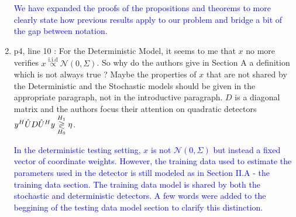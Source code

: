 \documentclass[11pt]{article}
\begin{document}
\begin{enumerate}
\textcolor{blue}{We have expanded the proofs of the propositions and theorems to more clearly state how previous results apply to our problem and bridge a bit of the gap between notation.}

\item p4, line 10 : For the Deterministic Model, it seems to me that $x$ no more verifies $x\overset{\text{i.i.d}}{\propto}\mathcal{N}(0,\Sigma)$. So why
do the authors give in Section A a definition which is not always true ? Maybe the properties of $x$ that are
not shared by the Deterministic and the Stochastic models should be given in the appropriate paragraph,
not in the introductive paragraph.
$D$ is a diagonal matrix and the authors focus their attention on quadratic detectors $y^H\hat{U}D\hat{U}^Hy\overset{H_1}{\underset{H_0}{\gtrless}}\eta$.

\textcolor{blue}{In the deterministic testing setting, $x$ is not $\mathcal{N}(0,\Sigma)$ but instead a fixed vector of coordinate weights. However, the training data used to estimate the parameters used in the detector is still modeled as in Section II.A - the training data section. The training data model is shared by both the stochastic and deterministic detectors. A few words were added to the beggining of the testing data model section to clarify this distinction.}

\end{enumerate}
\end{document}
